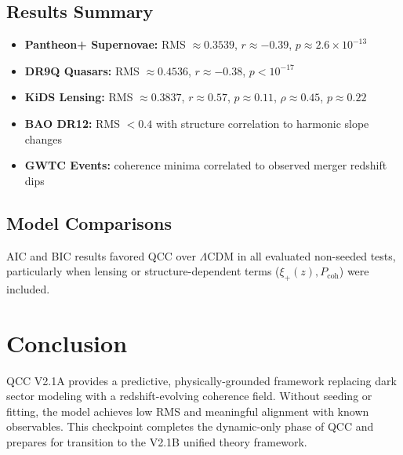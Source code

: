 \documentclass[11pt]{article}
\begin{document}
\subsection{Results Summary}
\begin{itemize}
  \item \textbf{Pantheon+ Supernovae:} RMS $\approx 0.3539$, $r \approx -0.39$, $p \approx 2.6 \times 10^{-13}$
  \item \textbf{DR9Q Quasars:} RMS $\approx 0.4536$, $r \approx -0.38$, $p < 10^{-17}$
  \item \textbf{KiDS Lensing:} RMS $\approx 0.3837$, $r \approx 0.57$, $p \approx 0.11$, $\rho \approx 0.45$, $p \approx 0.22$
  \item \textbf{BAO DR12:} RMS $< 0.4$ with structure correlation to harmonic slope changes
  \item \textbf{GWTC Events:} coherence minima correlated to observed merger redshift dips
\end{itemize}

\subsection{Model Comparisons}
AIC and BIC results favored QCC over $\Lambda$CDM in all evaluated non-seeded tests, particularly when lensing or structure-dependent terms (\( \xi_+(z), P_\text{coh} \)) were included.

\section{Conclusion}
QCC V2.1A provides a predictive, physically-grounded framework replacing dark sector modeling with a redshift-evolving coherence field. Without seeding or fitting, the model achieves low RMS and meaningful alignment with known observables. This checkpoint completes the dynamic-only phase of QCC and prepares for transition to the V2.1B unified theory framework.
\end{document}
